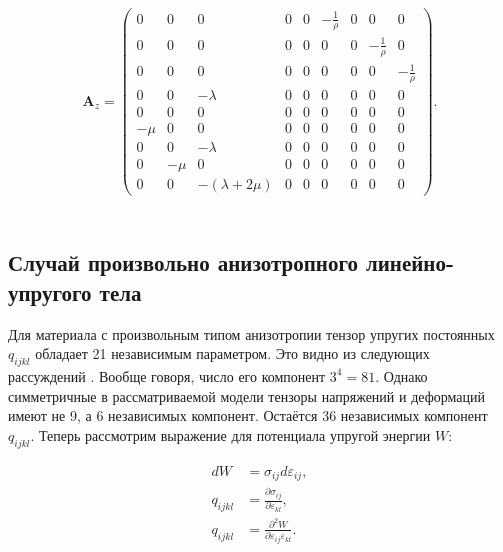 \begin{align}
\label{isotropic_mat3}
\mathbf{A}_z =
\left( \begin{array}{cccccccccccc}
0 & 0 & 0 & 0 & 0 & -\frac 1 \rho & 0 & 0 & 0 \\ 
0 & 0 & 0 & 0 & 0 & 0 & 0 & -\frac 1 \rho & 0 \\ 
0 & 0 & 0 & 0 & 0 & 0 & 0 & 0 & -\frac 1 \rho \\ 
0 & 0 & -\lambda & 0 & 0 & 0 & 0 & 0 & 0 \\ 
0 & 0 & 0 & 0 & 0 & 0 & 0 & 0 & 0 \\ 
-\mu & 0 & 0 & 0 & 0 & 0 & 0 & 0 & 0 \\ 
0 & 0 & -\lambda & 0 & 0 & 0 & 0 & 0 & 0 \\ 
0 & -\mu & 0 & 0 & 0 & 0 & 0 & 0 & 0 \\ 
0 & 0 & -(\lambda+2\mu) & 0 & 0 & 0 & 0 & 0 & 0  
\end{array} \right).
\end{align}\\


\subsection{Случай произвольно анизотропного линейно-упругого тела}
Для материала с произвольным типом анизотропии тензор упругих постоянных $q_{ijkl}$ обладает 21 независимым параметром.
Это видно из следующих рассуждений \cite{prodaivoda}. Вообще говоря, число его компонент $3^4 = 81$. Однако симметричные в рассматриваемой модели тензоры напряжений и деформаций имеют не 9, а 6 независимых компонент. Остаётся 36 независимых компонент $q_{ijkl}$. Теперь рассмотрим выражение для потенциала упругой энергии $W$:

\begin{eqnarray}
dW &= \sigma_{ij} d\varepsilon_{ij}, \\
q_{ijkl} &= \frac{\partial{\sigma_{ij}}}{\partial{\varepsilon_{kl}}}, \\
q_{ijkl} &= \frac{\partial^{2}{W}}{\partial{\varepsilon_{ij}\varepsilon_{kl}}}.
\end{eqnarray}

